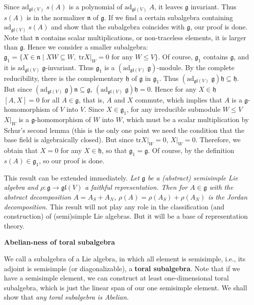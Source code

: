 \documentclass{article}
\newcommand{\SBar}{\;|\;}
\newcommand{\tr}[1]{\mathrm{tr}#1}
\newcommand{\lie}[1]{\mathfrak{#1}}
\newcommand{\adu}[2]{\mathrm{ad}_{#1}\; #2}
\begin{document}
Since $\adu{\lie{gl}(V)}{s(A)}$ is a polynomial of $\adu{\lie{gl}(V)}{A}$, it leaves $\lie{g}$ invariant. 
Thus $s(A)$ is in the normalizer $\lie{n}$ of $\lie{g}$.
If we find a certain subalgebra containing $\adu{\lie{gl}(V)}{s(A)}$ and show that the subalgebra coincides with $\lie{g}$, our proof is done.
Note that $\lie{n}$ contains scalar multiplications, or non-traceless elements, it is larger than $\lie{g}$.
Hence we consider a smaller subalgebra: $\lie{g}_1 = \{X \in \lie{n} \SBar XW \subseteq W, \; \tr{X|_W} = 0 \textrm{ for any $W \le V$}\}$.
Of course, $\lie{g}_1$ contains $\lie{g}$, and it is $\adu{\lie{gl}(V)}{\lie{g}}$-invariant.
Thus $\lie{g}_1$ is a $(\adu{\lie{gl}(V)}{\lie{g}})$-module.
By the complete reducibility, there is the complementary $\lie{h}$ of $\lie{g}$ in $\lie{g}_1$.
Thus $(\adu{\lie{gl}(V)}{\lie{g}})\lie{h} \subseteq \lie{h}$.
But since $(\adu{\lie{gl}(V)}{\lie{g}}) \lie{n} \subseteq \lie{g}$, $(\adu{\lie{gl}(V)}{\lie{g}})\lie{h} = 0$.
Hence for any $X \in \lie{h}$ $[A, X] = 0$ for all $A \in \lie{g}$, that is, $A$ and $X$ commute, which implies that $A$ is a $\lie{g}$-homomorphism of $V$ into $V$.
Since $X \in \lie{g}_1$, for any irreducible submodule $W \le V$ $X|_W$ is a $\lie{g}$-homomorphism of $W$ into $W$, which must be a scalar multiplication by Schur's second lemma (this is the only one point we need the condition that the base field is algebraically closed).
But since $\tr{X|_W} = 0$, $X|_W = 0$.
Therefore, we obtain that $X = 0$ for any $X \in \lie{h}$, so that $\lie{g}_1 = \lie{g}$.
Of course, by the definition $s(A) \in \lie{g}_1$, so our proof is done.

This result can be extended immediately.
\textit{Let $\lie{g}$ be a (abstract) semisimple Lie algebra and $\rho : \lie{g} \to \lie{gl}(V)$ a faithful representation.
Then for $A \in \lie{g}$ with the abstract decomposition $A = A_S + A_N$, $\rho(A) = \rho(A_S) + \rho(A_N)$ is the Jordan decomposition.}
This result will not play any role in the classification (and construction) of (semi)simple Lie algebras.
But it will be a base of representation theory.

\newpage

\textbf{Abelian-ness of toral subalgebra}

We call a subalgebra of a Lie algebra, in which all element is semisimple, i.e., its adjoint is semisimple (or diagonalizable), a \textbf{toral subalgebra}.
Note that if we have a semisimple element, we can construct at least one-dimensional toral subalgebra, which is just the linear span of our one semisimple element.
We shall show that \textit{any toral subalgebra is Abelian.}
\end{document}
